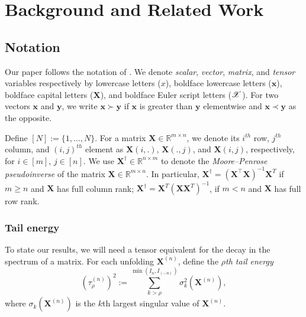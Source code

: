 \section{Background and Related Work}

\subsection{Notation}
Our paper follows the notation of \citep{kolda2009tensor}.
We denote \textit{scalar}, \textit{vector}, \textit{matrix}, and \textit{tensor} variables
respectively by lowercase letters ($x$), boldface lowercase letters ($\mathbf{x}$),
boldface capital letters  ($\mathbf{X}$),  and boldface Euler script letters ($\T{X}$).
For two vectors $\mathbf{x}$ and $\mathbf{y}$,
we write $\mathbf{x} \succ \mathbf{y}$ if $\mathbf{x}$ is greater than $\mathbf{y}$ elementwise and $\mathbf{x} \prec \mathbf{y}$ as the opposite. 

Define $[N] := \{1,\dots, N\}$.
For a matrix $\mathbf{X} \in \mathbb{R}^{m \times n}$,
we denote its $i^{th}$ row, $j^{th}$ column,
and $(i,j)^{th}$ element
as $\mathbf{X}(i,.)$, $\mathbf{X}(.,j)$, and $\mathbf{X}(i,j)$, respectively,
for $i \in [m]$, $j \in [n]$.
We use $\mathbf{X}^\dag \in \mathbb{R}^{n \times m}$ to denote the
\textit{Moore--Penrose pseudoinverse} of the matrix $\mathbf{X} \in \mathbb{R}^{m \times n}$.
In particular, $\mathbf{X}^\dag = (\mathbf{X}^\top \mathbf{X})^{-1}\mathbf{X}^T$
if $m \geq n$ and $\mathbf{X}$ has full column rank;
$\mathbf{X}^\dag = \mathbf{X}^T(\mathbf{XX}^T)^{-1}$,
if $m < n$ and $\mathbf{X}$ has full row rank. 

\subsubsection{Tail energy}
To state our results, we will need a tensor equivalent for the decay in the
spectrum of a matrix.
For each unfolding $\mathbf{X}^{(n)}$,
define the $\rho$\textit{th tail energy}
\begin{equation}
(\tau_\rho^{(n)})^2 := \sum_{k>\rho}^{\min(I_n,I_{(-n)})} \sigma_{k}^2(\mathbf{X}^{(n)}), \nonumber
\end{equation}
where $\sigma_{k}(\mathbf{X}^{(n)})$ is the $k$th largest singular value of $\mathbf{X}^{(n)}$.



